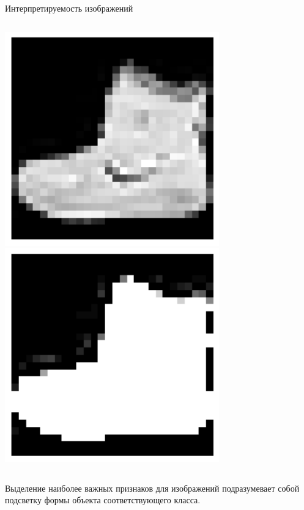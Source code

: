 \documentclass{beamer}
\begin{document}
\begin{frame}{Интерпретируемость изображений}

\begin{columns}[c]
\includegraphics[width=0.75\textwidth]{../fig/example.png}
\includegraphics[width=0.75\textwidth]{../fig/example_Lime.png}
\end{columns}

\bigskip
Выделение наиболее важных {\color{red}признаков} для изображений подразумевает собой подсветку {\color{red}формы} объекта соответствующего класса. 
\end{frame}
\end{document}
